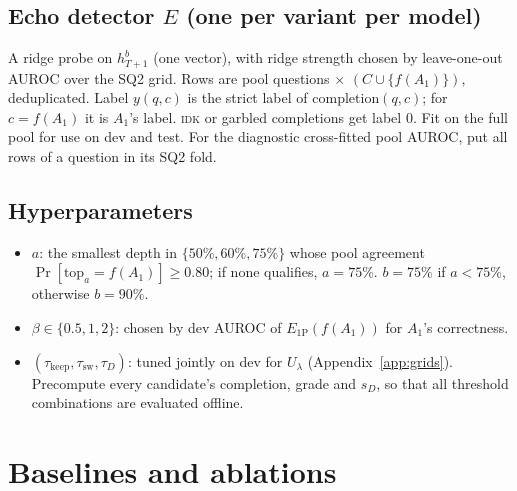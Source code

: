 \documentclass[11pt]{article}
\newcommand{\IDK}{\textsc{idk}}
\newcommand{\sD}{s_{D}}
\begin{document}
\subsection{Echo detector \texorpdfstring{$E$}{E} (one per variant per model)}
A ridge probe on $h^b_{T+1}$ (one vector), with ridge strength chosen by leave-one-out AUROC over the SQ2 grid.
Rows are pool questions $\times$ $(C \cup \{f(A_1)\})$, deduplicated. Label $y(q, c)$ is the strict label of
$\mathrm{completion}(q, c)$; for $c = f(A_1)$ it is $A_1$'s label. \IDK{} or garbled completions get label 0.
Fit on the full pool for use on dev and test. For the diagnostic cross-fitted pool AUROC, put all rows of a
question in its SQ2 fold.

\subsection{Hyperparameters}
\begin{itemize}
  \item $a$: the smallest depth in $\{50\%, 60\%, 75\%\}$ whose pool agreement
        $\Pr[\mathrm{top}_a = f(A_1)] \ge 0.80$; if none qualifies, $a = 75\%$.
        $b = 75\%$ if $a < 75\%$, otherwise $b = 90\%$.
  \item $\beta \in \{0.5, 1, 2\}$: chosen by dev AUROC of $E_{\mathrm{1P}}(f(A_1))$ for $A_1$'s correctness.
  \item $(\tau_{\mathrm{keep}}, \tau_{\mathrm{sw}}, \tau_D)$: tuned jointly on dev for $U_\lambda$
        (Appendix~\ref{app:grids}). Precompute every candidate's completion, grade and $\sD$, so that all
        threshold combinations are evaluated offline.
\end{itemize}

\section{Baselines and ablations}
\end{document}
